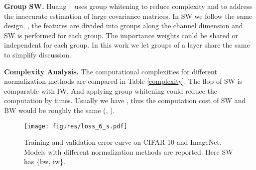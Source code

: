 \documentclass[10pt,twocolumn,letterpaper]{article}
\begin{document}
\noindent\textbf{Group SW.}
Huang \etal~\cite{lei2018decorrelated} uses group whitening to reduce complexity and to address the inaccurate estimation of large covariance matrices.
In SW we follow the same design, \ie, the features are divided into groups along the channel dimension and SW is performed for each group.
The importance weights  could be shared or independent for each group.
In this work we let groups of a layer share the same  to simplify discussion.


\setlength{\tabcolsep}{4pt}
\begin{table}[h]
	\begin{center}
		\caption{Comparisons of computational complexity.  are the number of samples, number of channels, height, and width of the input tensor respectively.  denotes the number of channels for each group in group whitening.}
		\label{complexity}
	\end{center}
\vspace{-5pt}
\end{table}
\setlength{\tabcolsep}{1.4pt}





\noindent\textbf{Complexity Analysis.}
The computational complexities for different normalization methods are compared in Table \ref{complexity}.
The flop of SW is comparable with IW.
And applying group whitening could reduce the computation by  times.
Usually we have , thus the computation cost of SW and BW would be roughly the same (\ie, ).

 	
\begin{figure*}[t!]
	\centering
	\texttt{[image: figures/loss\_6\_s.pdf]}
	\vspace{-10pt}
	\caption{Training and validation error curve on CIFAR-10 and ImageNet. Models with different normalization methods are reported. Here SW has  \{bw, iw\}.}
	\label{error_curve}
	\vspace{-5pt}
\end{figure*}
\end{document}
